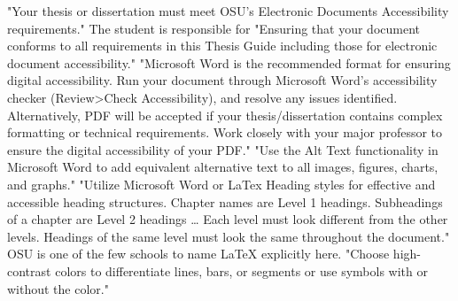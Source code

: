 %
%
%
\thesisrequiretagging
{}
	{"Your thesis or dissertation must meet OSU's Electronic Documents
	 Accessibility requirements." The student is responsible for "Ensuring that
	 your document conforms to all requirements in this Thesis Guide including
	 those for electronic document accessibility."}
	{"Microsoft Word is the recommended format for ensuring digital
	 accessibility. Run your document through Microsoft Word's accessibility
	 checker (Review>Check Accessibility), and resolve any issues identified.
	 Alternatively, PDF will be accepted if your thesis/dissertation contains
	 complex formatting or technical requirements. Work closely with your major
	 professor to ensure the digital accessibility of your PDF."}
	{"Use the Alt Text functionality in Microsoft Word to add equivalent
	 alternative text to all images, figures, charts, and graphs."}
	{"Utilize Microsoft Word or LaTex Heading styles for effective and
	 accessible heading structures. Chapter names are Level 1 headings.
	 Subheadings of a chapter are Level 2 headings … Each level must look
	 different from the other levels. Headings of the same level must look the
	 same throughout the document." OSU is one of the few schools to name LaTeX
	 explicitly here.}
	{"Choose high-contrast colors to differentiate lines, bars, or segments or
	 use symbols with or without the color."}

